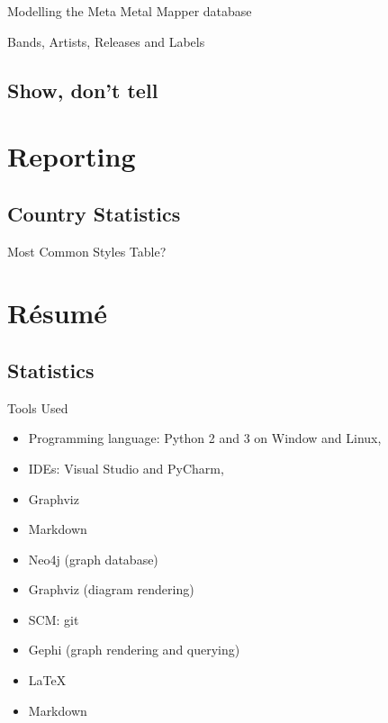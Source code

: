 \documentclass{beamer}
\begin{document}
    \begin{frame}{Modelling the Meta Metal Mapper database}
    
      Bands, Artists, Releases and Labels
    
    \end{frame}

  \subsection{Show, don't tell}


\section{Reporting}

  \subsection{Country Statistics}

    \begin{frame}{Most Common Styles}
      Table?
    \end{frame}

\section{Résumé}

  \subsection{Statistics}

    \begin{frame}{Tools Used}
      \begin{itemize}
        \item<1-> Programming language: Python 2 and 3 on Window and Linux,
        \item<1-> IDEs: Visual Studio and PyCharm,
        \item<1-> Graphviz
        \item<1-> Markdown
        \item<1-> Neo4j (graph database)
        \item<1-> Graphviz (diagram rendering)
        \item<1-> SCM: git
        \item<1-> Gephi (graph rendering and querying)
        \item<1-> \LaTeX{}
        \item<1-> Markdown
      \end{itemize}
    \end{frame}
    
\end{document}

